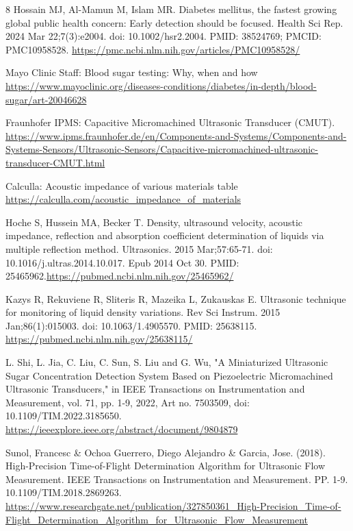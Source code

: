 \documentclass[runningheads]{llncs}
\begin{document}
\begin{thebibliography}{8}
Hossain MJ, Al-Mamun M, Islam MR. Diabetes mellitus, the fastest growing global public health concern: Early detection should be focused. Health Sci Rep. 2024 Mar 22;7(3):e2004. doi: 10.1002/hsr2.2004. PMID: 38524769; PMCID: PMC10958528. \url{https://pmc.ncbi.nlm.nih.gov/articles/PMC10958528/}

Mayo Clinic Staff: Blood sugar testing: Why, when and how \url{https://www.mayoclinic.org/diseases-conditions/diabetes/in-depth/blood-sugar/art-20046628}

Fraunhofer IPMS: Capacitive Micromachined Ultrasonic Transducer (CMUT). \url{https://www.ipms.fraunhofer.de/en/Components-and-Systems/Components-and-Systems-Sensors/Ultrasonic-Sensors/Capacitive-micromachined-ultrasonic-transducer-CMUT.html}

Calculla: Acoustic impedance of various materials table \url{https://calculla.com/acoustic_impedance_of_materials}

Hoche S, Hussein MA, Becker T. Density, ultrasound velocity, acoustic impedance, reflection and absorption coefficient determination of liquids via multiple reflection method. Ultrasonics. 2015 Mar;57:65-71. doi: 10.1016/j.ultras.2014.10.017. Epub 2014 Oct 30. PMID: 25465962.\url{https://pubmed.ncbi.nlm.nih.gov/25465962/}

Kazys R, Rekuviene R, Sliteris R, Mazeika L, Zukauskas E. Ultrasonic technique for monitoring of liquid density variations. Rev Sci Instrum. 2015 Jan;86(1):015003. doi: 10.1063/1.4905570. PMID: 25638115.
\url{https://pubmed.ncbi.nlm.nih.gov/25638115/}

L. Shi, L. Jia, C. Liu, C. Sun, S. Liu and G. Wu, "A Miniaturized Ultrasonic Sugar Concentration Detection System Based on Piezoelectric Micromachined Ultrasonic Transducers," in IEEE Transactions on Instrumentation and Measurement, vol. 71, pp. 1-9, 2022, Art no. 7503509, doi: 10.1109/TIM.2022.3185650.
\url{https://ieeexplore.ieee.org/abstract/document/9804879}

Sunol, Francesc \& Ochoa Guerrero, Diego Alejandro \& Garcia, Jose. (2018). High-Precision Time-of-Flight Determination Algorithm for Ultrasonic Flow Measurement. IEEE Transactions on Instrumentation and Measurement. PP. 1-9. 10.1109/TIM.2018.2869263. \url{https://www.researchgate.net/publication/327850361_High-Precision_Time-of-Flight_Determination_Algorithm_for_Ultrasonic_Flow_Measurement}


\end{thebibliography}
\end{document}
